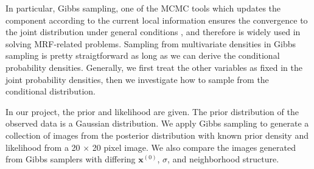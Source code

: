 In particular, Gibbs sampling, one of the MCMC tools which updates the component according to the current local information ensures the convergence to the joint distribution under general conditions \cite{Besag1993}, and therefore is widely used in solving MRF-related problems. 
Sampling from multivariate densities in Gibbs sampling is pretty straigtforward as long as we can derive the conditional probability densities.
Generally, we first treat the other variables as fixed in the joint probability densities, then we investigate how to sample from the conditional distribution.

In our project, the prior and likelihood are given.
The prior distribution of the observed data is a Gaussian distribution.
We apply Gibbs sampling to generate a collection of images from the posterior distribution with known prior density  and likelihood  from a 20 $\times$ 20 pixel image.
We also compare the images generated from Gibbs samplers with differing $\mathbf{x}^{(0)}$, $\sigma$, and neighborhood structure. 